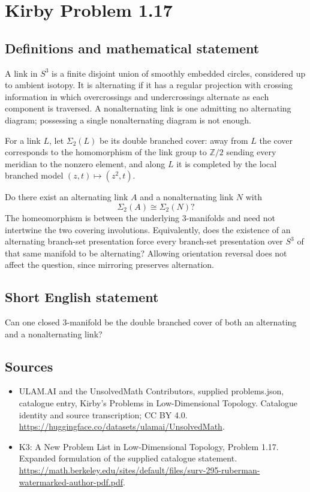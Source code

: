 \documentclass[11pt,a4paper]{article}
\begin{document}
\section*{Kirby Problem 1.17}\label{statement}

\subsection{Definitions and mathematical statement}
A link in $S^3$ is a finite disjoint union of smoothly embedded circles, considered
up to ambient isotopy. It is alternating if it has a regular projection with
crossing information in which overcrossings and undercrossings alternate as each
component is traversed. A nonalternating link is one admitting no alternating
diagram; possessing a single nonalternating diagram is not enough.

For a link $L$, let $\Sigma_2(L)$ be its double branched cover: away from $L$ the
cover corresponds to the homomorphism of the link group to $\mathbb Z/2$ sending
every meridian to the nonzero element, and along $L$ it is completed by the local
branched model $(z,t)\mapsto(z^2,t)$.

Do there exist an alternating link $A$ and a nonalternating link $N$ with
\[
\Sigma_2(A)\cong\Sigma_2(N)?
\]
The homeomorphism is between the underlying $3$-manifolds and need not intertwine
the two covering involutions. Equivalently, does the existence of an alternating
branch-set presentation force every branch-set presentation over $S^3$ of that
same manifold to be alternating? Allowing orientation reversal does not affect
the question, since mirroring preserves alternation.
\subsection{Short English statement}
Can one closed $3$-manifold be the double branched cover of both an alternating and a nonalternating link?
\subsection{Sources}
\begin{itemize}
\item[S1] ULAM.AI and the UnsolvedMath Contributors, supplied problems.json, catalogue entry, Kirby's Problems in Low-Dimensional Topology. Catalogue identity and source transcription; CC BY 4.0.
\url{https://huggingface.co/datasets/ulamai/UnsolvedMath}.
\item[S2] K3: A New Problem List in Low-Dimensional Topology, Problem 1.17. Expanded formulation of the supplied catalogue statement.
\url{https://math.berkeley.edu/sites/default/files/surv-295-ruberman-watermarked-author-pdf.pdf}.
\end{itemize}
\end{document}
